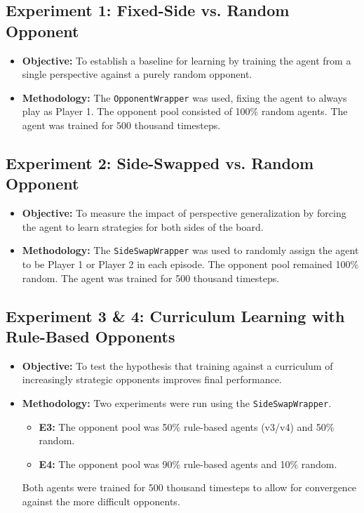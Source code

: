 \documentclass[conference]{IEEEtran}
\begin{document}
\subsection{Experiment 1: Fixed-Side vs. Random Opponent}
\begin{itemize}
    \item \textbf{Objective:} To establish a baseline for learning by training the agent from a single perspective against a purely random opponent.
    \item \textbf{Methodology:} The \texttt{OpponentWrapper} was used, fixing the agent to always play as Player 1. The opponent pool consisted of 100\% random agents. The agent was trained for 500 thousand timesteps.
\end{itemize}

\subsection{Experiment 2: Side-Swapped vs. Random Opponent}
\begin{itemize}
    \item \textbf{Objective:} To measure the impact of perspective generalization by forcing the agent to learn strategies for both sides of the board.
    \item \textbf{Methodology:} The \texttt{SideSwapWrapper} was used to randomly assign the agent to be Player 1 or Player 2 in each episode. The opponent pool remained 100\% random. The agent was trained for 500 thousand timesteps.
\end{itemize}

\subsection{Experiment 3 & 4: Curriculum Learning with Rule-Based Opponents}
\begin{itemize}
    \item \textbf{Objective:} To test the hypothesis that training against a curriculum of increasingly strategic opponents improves final performance.
    \item \textbf{Methodology:} Two experiments were run using the \texttt{SideSwapWrapper}.
        \begin{itemize}
            \item \textbf{E3:} The opponent pool was 50\% rule-based agents (v3/v4) and 50\% random.
            \item \textbf{E4:} The opponent pool was 90\% rule-based agents and 10\% random.
        \end{itemize}
    Both agents were trained for 500 thousand timesteps to allow for convergence against the more difficult opponents.
\end{itemize}
\end{document}

